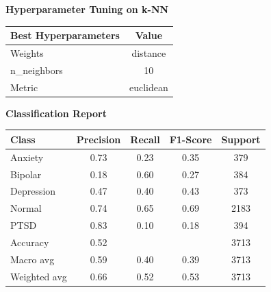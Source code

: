 \begin{center}
    \textbf{Hyperparameter Tuning on k-NN} \\[0.5em]
    \begin{tabular}{|l|c|}
        \hline
        \textbf{Best Hyperparameters}  & \textbf{Value} \\ \hline
        Weights                       & distance       \\ \hline
        n\_neighbors                  & 10             \\ \hline
        Metric                        & euclidean      \\ \hline
    \end{tabular}
\end{center}

\begin{center}
    \textbf{Classification Report} \\[0.5em]
    \begin{tabular}{|l|c|c|c|c|}
        \hline
        \textbf{Class}  & \textbf{Precision}  & \textbf{Recall} & \textbf{F1-Score} & \textbf{Support} \\ \hline
        Anxiety         & 0.73                & 0.23            & 0.35              & 379             \\ \hline
        Bipolar         & 0.18                & 0.60            & 0.27              & 384             \\ \hline
        Depression      & 0.47                & 0.40            & 0.43              & 373             \\ \hline
        Normal          & 0.74                & 0.65            & 0.69              & 2183            \\ \hline
        PTSD            & 0.83                & 0.10            & 0.18              & 394             \\ \hline
        Accuracy        & 0.52                &                 &                   & 3713            \\ \hline
        Macro avg       & 0.59                & 0.40            & 0.39              & 3713            \\ \hline
        Weighted avg    & 0.66                & 0.52            & 0.53              & 3713            \\ \hline
    \end{tabular}
\end{center}

